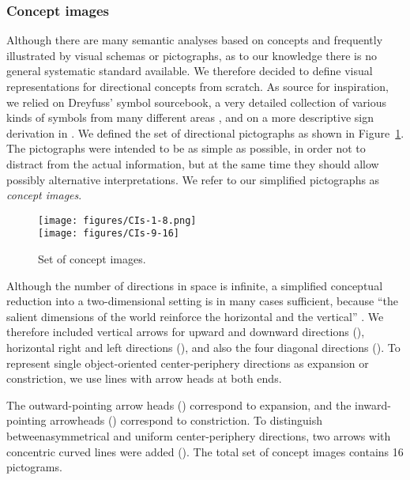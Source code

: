 \documentclass[output=paper]{langsci/langscibook}
\begin{document}
\subsubsection{Concept images}
\label{sec:image-schema}

Although there are many semantic analyses based on concepts and
frequently illustrated by visual schemas or pictographs, as to our
knowledge there is no general systematic standard available. We
therefore decided to define visual representations for directional
concepts from scratch. As source for inspiration, we relied on
Dreyfuss' symbol sourcebook, a very detailed collection of various
kinds of symbols from many different areas \citep{Dreyfuss:84}, and on
a more descriptive sign derivation in \cite{Frutiger:87}. We defined
the set of directional pictographs as shown in
Figure~\ref{fig:CIdir}. The pictographs were intended to be as simple
as possible, in order not to distract from the actual information, but at the
same time they should allow possibly alternative interpretations. We
refer to our simplified pictographs as \textit{concept images}.

\begin{figure}
  \caption{Set of concept images.}
  \label{fig:CIdir}
  \texttt{[image: figures/CIs-1-8.png]}\\
  \texttt{[image: figures/CIs-9-16]}
\end{figure}

Although the number of directions in space is infinite, a simplified
conceptual reduction into a two-dimensional setting is in many cases
sufficient, because ``the salient dimensions of the world reinforce
the horizontal and the vertical'' \citep{Tversky:11}. We therefore
included vertical arrows for upward and downward directions
(), horizontal right and left directions
(), and also the four diagonal
directions (). To represent single object-oriented center-periphery
directions as expansion or constriction, we use lines with arrow heads at
both ends.

The outward-pointing arrow heads
()
correspond to expansion, and the inward-pointing arrow\linebreak heads
() correspond to constriction. To distinguish
between\linebreak asymmetrical and uniform center-periphery directions, two
arrows with concentric curved lines were added (). The total set of concept images contains 16 pictograms.
\end{document}
